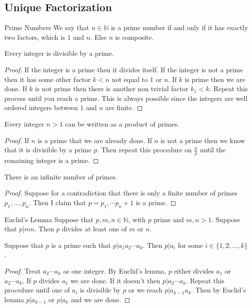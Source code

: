 \documentclass[a4paper]{article}
\begin{document}
\subsection{Unique Factorization}
\begin{defn}{Prime Numbers}{} We say that $n\in\mathbb{N}$ is a prime number if and only if it has exactly two factors, which is $1$ and $n$. Else $n$ is composite. 
\end{defn}

\begin{lmm}{}{} Every integer is divisible by a prime. \tcbline
\begin{proof}
If the integer is a prime then it divides itself. If the integer is not a prime then it has some other factor $k<n$ not equal to $1$ or $n$. If $k$ is prime then we are done. If $k$ is not prime then there is another non trivial factor $k_1<k$. Repeat this process until you reach a prime. This is always possible since the integers are well ordered integers between $1$ and $n$ are finite. 
\end{proof}
\end{lmm}

\begin{lmm}{}{} Every integer $n>1$ can be written as a product of primes. \tcbline
\begin{proof}
If $n$ is a prime that we are already done. If $n$ is not a prime then we know that it is divisible by a prime $p$. Then repeat this procedure on $\frac{n}{p}$ until the remaining integer is a prime. 
\end{proof}
\end{lmm}

\begin{thm}{}{} There is an infinite number of primes. \tcbline
\begin{proof}
Suppose for a contradiction that there is only a finite number of primes $p_1,\dots,p_n$. Then I claim that $p=p_1,\cdots p_n+1$ is a prime. 
\end{proof}
\end{thm}

\begin{prp}{Euclid's Lemma}{} Suppose that $p,m,n\in\mathbb{N}$, with $p$ prime and $m,n>1$. Suppose that $p|mn$. Then $p$ divides at least one of $m$ or $n$. 
\end{prp}

\begin{prp}{}{} Suppose that $p$ is a prime such that $p|a_1a_2\cdots a_k$. Then $p|a_i$ for some $i\in\{1,2,\dots,k\}$. \tcbline
\begin{proof}
Treat $a_2\cdots a_k$ as one integer. By Euclid's lemma, $p$ either divides $a_1$ or $a_2\cdots a_k$. If $p$ divides $a_1$ we are done. If it doesn't then $p|a_2\cdots a_k$. Repeat this procedure until one of $a_i$ is divisible by $p$ or we reach $p|a_{k-1}a_k$. Then by Euclid's lemma $p|a_{k-1}$ or $p|a_k$ and we are done. 
\end{proof}
\end{prp}
\end{document}
